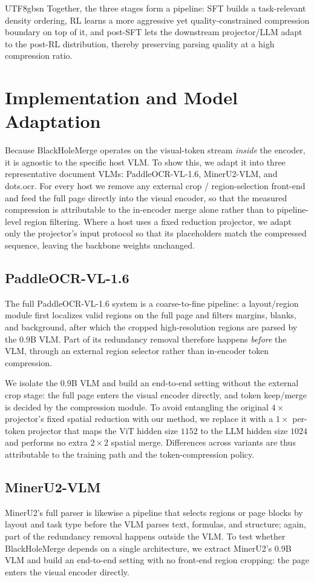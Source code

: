 \documentclass[10pt,twocolumn,letterpaper]{article}
\newcommand{\ours}{BlackHoleMerge}
\begin{document}
\begin{CJK}{UTF8}{gbsn}
Together, the three stages form a pipeline: SFT builds a task-relevant density ordering, RL
learns a more aggressive yet quality-constrained compression boundary on top of it, and
post-SFT lets the downstream projector/LLM adapt to the post-RL distribution, thereby
preserving parsing quality at a high compression ratio.

\section{Implementation and Model Adaptation}
\label{sec:supp_impl}

Because \ours{} operates on the visual-token stream \emph{inside} the encoder, it is agnostic
to the specific host VLM. To show this, we adapt it into three representative document VLMs:
PaddleOCR-VL-1.6, MinerU2-VLM, and dots.ocr. For every host we remove any external crop /
region-selection front-end and feed the full page directly into the visual encoder, so that the
measured compression is attributable to the in-encoder merge alone rather than to pipeline-level
region filtering. Where a host uses a fixed reduction projector, we adapt only the projector's
input protocol so that its placeholders match the compressed sequence, leaving the backbone
weights unchanged.

\subsection{PaddleOCR-VL-1.6}
The full PaddleOCR-VL-1.6 system is a coarse-to-fine pipeline: a layout/region module first
localizes valid regions on the full page and filters margins, blanks, and background, after which
the cropped high-resolution regions are parsed by the 0.9B VLM. Part of its redundancy removal
therefore happens \emph{before} the VLM, through an external region selector rather than
in-encoder token compression.

We isolate the 0.9B VLM and build an end-to-end setting without the external crop stage: the full
page enters the visual encoder directly, and token keep/merge is decided by the compression
module. To avoid entangling the original $4\times$ projector's fixed spatial reduction with our
method, we replace it with a $1\times$ per-token projector that maps the ViT hidden size $1152$ to
the LLM hidden size $1024$ and performs no extra $2\times2$ spatial merge. Differences across
variants are thus attributable to the training path and the token-compression policy.

\subsection{MinerU2-VLM}
MinerU2's full parser is likewise a pipeline that selects regions or page blocks by layout and
task type before the VLM parses text, formulas, and structure; again, part of the redundancy
removal happens outside the VLM. To test whether \ours{} depends on a single architecture, we
extract MinerU2's 0.9B VLM and build an end-to-end setting with no front-end region cropping: the
page enters the visual encoder directly.


\end{CJK}
\end{document}
